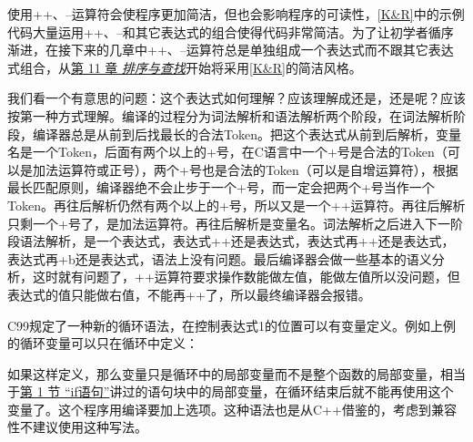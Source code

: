 使用++、--运算符会使程序更加简洁，但也会影响程序的可读性，\hyperlink{db.bi01.bibli.kr}{[K\&R]}中的示例代码大量运用++、--和其它表达式的组合使得代码非常简洁。为了让初学者循序渐进，在接下来的几章中++、--运算符总是单独组成一个表达式而不跟其它表达式组合，从\hyperlink{db.ch11.id2745173}{第 11 章 \emph{排序与查找}}开始将采用\hyperlink{db.bi01.bibli.kr}{[K\&R]}的简洁风格。



我们看一个有意思的问题：这个表达式如何理解？应该理解成还是，还是呢？应该按第一种方式理解。编译的过程分为词法解析和语法解析两个阶段，在词法解析阶段，编译器总是从前到后找最长的合法Token。把这个表达式从前到后解析，变量名是一个Token，后面有两个以上的+号，在C语言中一个+号是合法的Token（可以是加法运算符或正号），两个+号也是合法的Token（可以是自增运算符），根据最长匹配原则，编译器绝不会止步于一个+号，而一定会把两个+号当作一个Token。再往后解析仍然有两个以上的+号，所以又是一个++运算符。再往后解析只剩一个+号了，是加法运算符。再往后解析是变量名。词法解析之后进入下一阶段语法解析，是一个表达式，表达式++还是表达式，表达式再++还是表达式，表达式再+b还是表达式，语法上没有问题。最后编译器会做一些基本的语义分析，这时就有问题了，++运算符要求操作数能做左值，能做左值所以没问题，但表达式的值只能做右值，不能再++了，所以最终编译器会报错。



C99规定了一种新的循环语法，在控制表达式1的位置可以有变量定义。例如上例的循环变量可以只在循环中定义：




如果这样定义，那么变量只是循环中的局部变量而不是整个函数的局部变量，相当于\hyperlink{db.ch04s01.id2718043}{第 1 节 “if语句”}讲过的语句块中的局部变量，在循环结束后就不能再使用这个变量了。这个程序用编译要加上选项。这种语法也是从C+\BookSplit{}+\BookSplit{}借鉴的，考虑到兼容性不建议使用这种写法。



